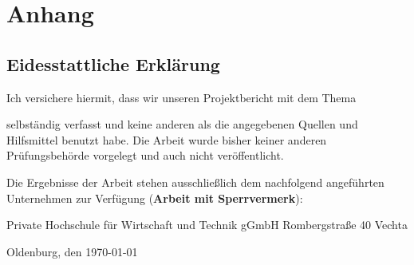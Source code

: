 \appendix
\chapter{Anhang}
\label{ch:anhang}







\section{Eidesstattliche Erklärung}
\label{cha:Eidesstattliche Erklärung}

Ich versichere hiermit, dass wir unseren Projektbericht mit dem Thema

\textbf{\titel}

selbständig verfasst und keine anderen als die angegebenen Quellen und 
Hilfsmittel benutzt habe. Die Arbeit wurde bisher keiner anderen Prüfungsbehörde 
vorgelegt und auch nicht veröffentlicht.

Die Ergebnisse der Arbeit stehen ausschließlich dem nachfolgend angeführten Unternehmen 
zur Verfügung (\textbf{Arbeit mit Sperrvermerk}):

\begin{addmargin}[1cm]{1cm}
	

		
	Private Hochschule für Wirtschaft und Technik gGmbH \newline
	Rombergstraße 40 Vechta 
	
	
\end{addmargin}
\vspace{1cm}

Oldenburg, den \today

